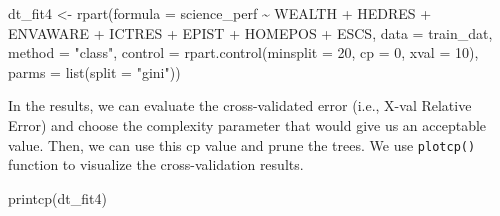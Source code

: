 \documentclass[
]{book}
\newenvironment{Shaded}{\begin{snugshade}}{\end{snugshade}}
\newcommand{\AttributeTok}[1]{\textcolor[rgb]{0.77,0.63,0.00}{#1}}
\newcommand{\DecValTok}[1]{\textcolor[rgb]{0.00,0.00,0.81}{#1}}
\newcommand{\FunctionTok}[1]{\textcolor[rgb]{0.00,0.00,0.00}{#1}}
\newcommand{\NormalTok}[1]{#1}
\newcommand{\OtherTok}[1]{\textcolor[rgb]{0.56,0.35,0.01}{#1}}
\newcommand{\SpecialCharTok}[1]{\textcolor[rgb]{0.00,0.00,0.00}{#1}}
\newcommand{\StringTok}[1]{\textcolor[rgb]{0.31,0.60,0.02}{#1}}
\begin{document}
\begin{Shaded}
\begin{Highlighting}[]
\NormalTok{dt\_fit4 }\OtherTok{\textless{}{-}} \FunctionTok{rpart}\NormalTok{(}\AttributeTok{formula =}\NormalTok{ science\_perf }\SpecialCharTok{\textasciitilde{}}\NormalTok{ WEALTH }\SpecialCharTok{+}\NormalTok{ HEDRES }\SpecialCharTok{+}\NormalTok{ ENVAWARE }\SpecialCharTok{+}\NormalTok{ ICTRES }\SpecialCharTok{+} 
\NormalTok{                   EPIST }\SpecialCharTok{+}\NormalTok{ HOMEPOS }\SpecialCharTok{+}\NormalTok{ ESCS,}
                 \AttributeTok{data =}\NormalTok{ train\_dat,}
                 \AttributeTok{method =} \StringTok{"class"}\NormalTok{, }
                 \AttributeTok{control =} \FunctionTok{rpart.control}\NormalTok{(}\AttributeTok{minsplit =} \DecValTok{20}\NormalTok{,}
                                         \AttributeTok{cp =} \DecValTok{0}\NormalTok{,}
                                         \AttributeTok{xval =} \DecValTok{10}\NormalTok{),}
                \AttributeTok{parms =} \FunctionTok{list}\NormalTok{(}\AttributeTok{split =} \StringTok{"gini"}\NormalTok{))}
\end{Highlighting}
\end{Shaded}

In the results, we can evaluate the cross-validated error (i.e., X-val Relative Error) and choose the complexity parameter that would give us an acceptable value. Then, we can use this cp value and prune the trees. We use \texttt{plotcp()} function to visualize the cross-validation results.

\begin{Shaded}
\begin{Highlighting}[]
\FunctionTok{printcp}\NormalTok{(dt\_fit4)}
\end{Highlighting}
\end{Shaded}
\end{document}
